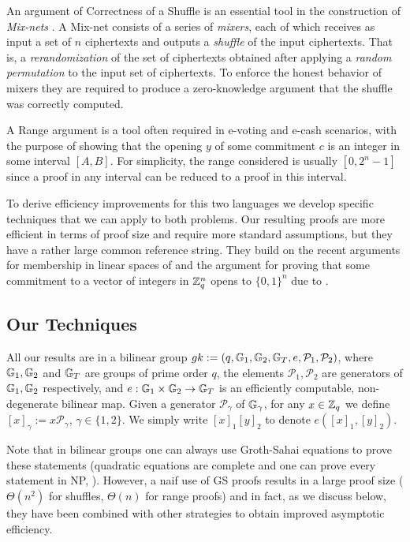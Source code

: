 An argument of Correctness of a Shuffle is an essential tool in the construction of \emph{Mix-nets} \cite{Chaum81}. A Mix-net consists of a series of \emph{mixers}, each of which receives as input a set of $n$ ciphertexts and  outputs a \emph{shuffle} of the input ciphertexts. That is, a \emph{rerandomization} of the set of ciphertexts obtained after applying a \emph{random permutation} to the input set of ciphertexts. To enforce the honest behavior of mixers they are required to produce a zero-knowledge argument that the shuffle was correctly computed.  

A Range argument is a tool often required in e-voting and e-cash scenarios, with the purpose of showing that the opening $y$ of some commitment $c$ is an integer in some interval $[A,B]$. For simplicity, the range considered is usually $[0,2^n-1]$ since a proof in any interval can be reduced to a proof in this interval.

To derive efficiency improvements for this two languages we develop specific techniques that we can apply to both problems. Our resulting proofs are more efficient in terms of proof size and require more standard assumptions, but they have a rather large common reference string. They build on the recent arguments for membership in linear spaces of \cite{EC:LPJY14,C:JutRoy14,EC:KilWee15} and the argument for proving that some commitment to a vector of integers in $\mathbb{Z}_q^{n}$ opens to $\{0,1\}^n$ due to \cite{AC:GonHevRaf15}. 
  
\subsection{Our Techniques}
All our results are in a bilinear group $gk:=(q,\mathbb{G}_1,\mathbb{G}_2,\mathbb{G}_T,e,\mathcal{P}_1,\mathcal{P}_2)$, where $\mathbb{G}_1,\mathbb{G}_2$
and $\mathbb{G}_T$ are groups of prime order $q$, the elements $\mathcal{P}_1, \mathcal{P}_2$ are generators of 
$\mathbb{G}_1,\mathbb{G}_2$ respectively, and $e:\mathbb{G}_1\times\mathbb{G}_2\to\mathbb{G}_T$ is an efficiently
computable, non-degenerate bilinear map. Given a generator $\mathcal{P}_\gamma$ of $\mathbb{G}_\gamma$, for any $x\in\mathbb{Z}_q$ we define $[x]_\gamma:=x\mathcal{P}_\gamma$, $\gamma\in\{1,2\}$. We simply write $[x]_1[y]_2$ to denote $e([x]_1,[y]_2)$.

Note that in bilinear groups one can always use Groth-Sahai equations to prove these statements (quadratic equations are complete and one can prove every statement in NP, \cite{EC:GroOstSah06}).  However, a  naif use of GS proofs results in a large proof size ($\Theta(n^2)$ for shuffles, $\Theta(n)$ for range proofs) and in fact, as we discuss below, they have been combined with other strategies to obtain improved asymptotic efficiency. 

